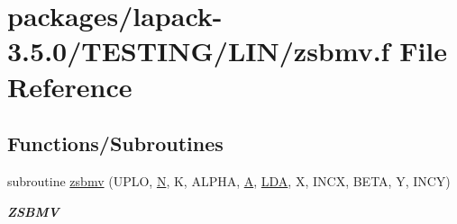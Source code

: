 \hypertarget{LIN_2zsbmv_8f}{}\section{packages/lapack-\/3.5.0/\+T\+E\+S\+T\+I\+N\+G/\+L\+I\+N/zsbmv.f File Reference}
\label{LIN_2zsbmv_8f}
\subsection*{Functions/\+Subroutines}
\begin{DoxyCompactItemize}
\item 
subroutine \hyperlink{group__complex16__lin_ga63eabd833fa379aa63dafb0a57392fe4}{zsbmv} (U\+P\+L\+O, \hyperlink{polmisc_8c_a0240ac851181b84ac374872dc5434ee4}{N}, K, A\+L\+P\+H\+A, \hyperlink{classA}{A}, \hyperlink{example__user_8c_ae946da542ce0db94dced19b2ecefd1aa}{L\+D\+A}, X, I\+N\+C\+X, B\+E\+T\+A, Y, I\+N\+C\+Y)
\begin{DoxyCompactList}\small\item\em {\bfseries Z\+S\+B\+M\+V} \end{DoxyCompactList}\end{DoxyCompactItemize}
